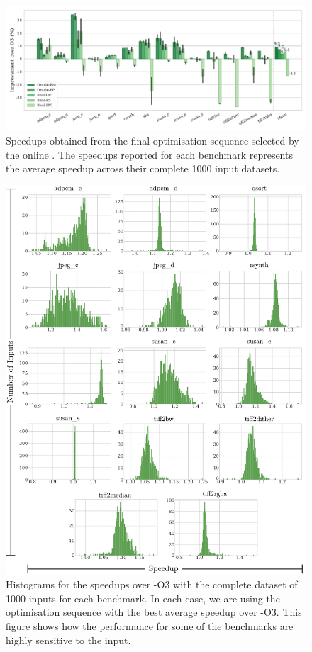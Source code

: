 \begin{figure}[htb]
    \centering
    \includegraphics[width=\textwidth]{figs/speedups.pdf}
    \caption{Speedups obtained from the final optimisation sequence selected by the online {\itercomp}.
	         The speedups reported for each benchmark represents the average speedup across their complete 1000 input datasets.}
    \label{fig:speedups}
\end{figure}


\begin{figure}[h!]
    \centering
    \includegraphics[width=\textwidth]{figs/speedups-per-input.pdf}
    \caption{Histograms for the speedups over {\flagstype -O3} with the complete dataset of 1000 inputs for each benchmark.
             In each case, we are using the optimisation sequence with the best average speedup over {\flagstype -O3}.
             This figure shows how the performance for some of the benchmarks are highly sensitive to the input.}
    \label{fig:speedups-per-input}
\end{figure}

